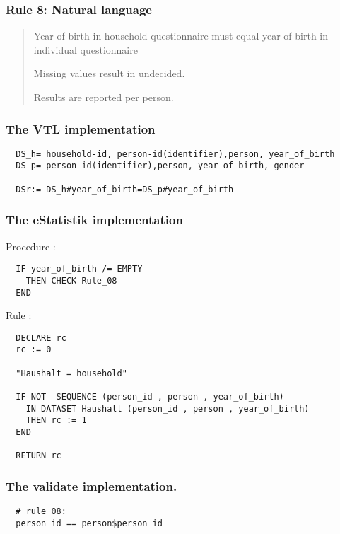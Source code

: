 \newpage

\subsubsection*{  Rule 8: Natural language}
\begin{quote}


Year of birth in household questionnaire must equal year of birth in individual questionnaire

Missing values result in undecided.

Results are reported per person.


\end{quote}
\subsubsection*{The VTL implementation}
\begin{verbatim}
  DS_h= household-id, person-id(identifier),person, year_of_birth
  DS_p= person-id(identifier),person, year_of_birth, gender

  DSr:= DS_h#year_of_birth=DS_p#year_of_birth
\end{verbatim}
\subsubsection*{The eStatistik implementation}
\noindent
Procedure :
\begin{verbatim}
  IF year_of_birth /= EMPTY
    THEN CHECK Rule_08
  END
\end{verbatim}
\noindent
Rule :
\begin{verbatim}
  DECLARE rc
  rc := 0

  "Haushalt = household"

  IF NOT  SEQUENCE (person_id , person , year_of_birth) 
    IN DATASET Haushalt (person_id , person , year_of_birth)
    THEN rc := 1
  END

  RETURN rc
\end{verbatim}

\subsubsection*{The validate implementation.}
\begin{verbatim}
  # rule_08:
  person_id == person$person_id
\end{verbatim}


\newpage

